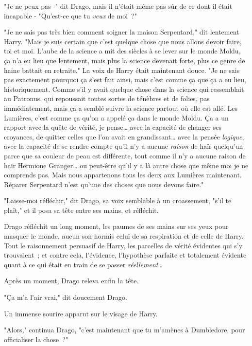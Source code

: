 "Je ne peux pas -" dit Drago, mais il n'était même pas sûr de ce dont il était incapable - "Qu'est-ce que tu \emph{veux} de moi~?"

"Je ne sais pas très bien comment soigner la maison Serpentard," dit lentement Harry. "Mais je suis certain que c'est quelque chose que nous allons devoir faire, toi et moi. L'aube de la science a mit des siècles à se lever sur le monde Moldu, ça n'a eu lieu que lentement, mais plus la science devenait forte, plus ce genre de haine battait en retraite." La voix de Harry était maintenant douce. "Je ne sais pas exactement pourquoi ça s'est fait ainsi, mais c'est comme ça que ça a eu lieu, historiquement. Comme s'il y avait quelque chose dans la science qui ressemblait au Patronus, qui repoussait toutes sortes de ténèbres et de folies, pas immédiatement, mais ça a semblé suivre la science partout où elle est allé. Les Lumières, c'est comme ça qu'on a appelé ça dans le monde Moldu. Ça a un rapport avec la quête de vérité, je pense… avec la capacité de changer ses croyances, de quitter celles que l'on avait en grandissant… avec la pensée \emph{logique}, avec la capacité de se rendre compte qu'il n'y a aucune \emph{raison} de haïr quelqu'un parce que sa couleur de peau est différente, tout comme il n'y a aucune raison de haïr Hermione Granger… ou peut-être qu'il y a là autre chose que même moi je ne comprends pas. Mais nous appartenons tous les deux aux Lumières maintenant. Réparer Serpentard n'est qu'une des choses que nous devons faire."

"Laisse-moi réfléchir," dit Drago, sa voix semblable à un croassement, "s'il te plaît," et il posa sa tête entre ses mains, et réfléchit.

\later

Drago réfléchit un long moment, les paumes de ses mains sur ses yeux pour masquer le monde, aucun son hormis celui de sa respiration et de celle de Harry. Tout le raisonnement persuasif de Harry, les parcelles de vérité évidentes qui s'y trouvaient~; et contre cela, l'évidence, l'hypothèse parfaite et totalement évidente quant à ce qui était en train de se passer \emph{réellement}…

Après un moment, Drago releva enfin la tête.

"Ça m'a l'air vrai," dit doucement Drago.

Un immense sourire apparut sur le visage de Harry.

"Alors," continua Drago, "c'est maintenant que tu m'amènes à Dumbledore, pour officialiser la chose~?"

